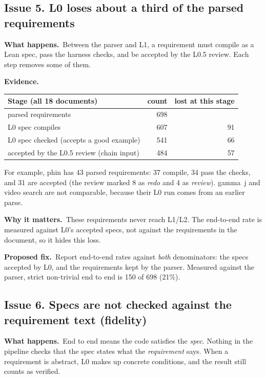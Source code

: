\documentclass[10pt,a4paper]{article}
\newcommand{\what}{\par\smallskip\textbf{What happens.}~}
\newcommand{\evidence}{\par\smallskip\textbf{Evidence.}~}
\newcommand{\why}{\par\smallskip\textbf{Why it matters.}~}
\newcommand{\fix}{\par\smallskip\textbf{Proposed fix.}~}
\begin{document}
\subsection*{Issue 5. L0 loses about a third of the parsed requirements}
\what Between the parser and L1, a requirement must compile as a Lean spec, pass the harness checks, and be accepted by the
L0.5 review. Each step removes some of them.

\evidence
\begin{center}
\begin{tabular}{@{}lrr@{}}
\toprule
Stage (all 18 documents) & count & lost at this stage \\
\midrule
parsed requirements                       & 698 & \\
L0 spec compiles                          & 607 & 91 \\
L0 spec checked (accepts a good example)  & 541 & 66 \\
accepted by the L0.5 review (chain input) & 484 & 57 \\
\bottomrule
\end{tabular}
\end{center}
For example, phin has 43 parsed requirements: 37 compile, 34 pass the checks, and 31 are accepted (the review marked 8 as
\emph{redo} and 4 as \emph{review}). gamma~j and video search are not comparable, because their L0 run comes from an earlier parse.

\why These requirements never reach L1/L2. The end-to-end rate is measured against L0's accepted specs, not against the
requirements in the document, so it hides this loss.

\fix Report end-to-end rates against \emph{both} denominators: the specs accepted by L0, and the requirements kept by the
parser. Measured against the parser, strict non-trivial end to end is 150 of 698 (21\%).

\subsection*{Issue 6. Specs are not checked against the requirement text (fidelity)}
\what End to end means the code satisfies the \emph{spec}. Nothing in the pipeline checks that the spec states what the
\emph{requirement} says. When a requirement is abstract, L0 makes up concrete conditions, and the result still counts as verified.
\end{document}
